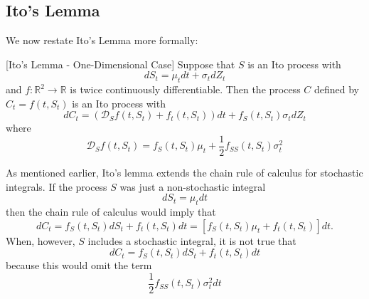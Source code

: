 \documentclass[\topdir/lecture\_notes.tex]{subfiles}
\begin{document}
\subsection{Ito's Lemma}
We now restate Ito's Lemma more formally:
\begin{theorem}\label{thm:ito_lemma}[Ito's Lemma - One-Dimensional Case]
Suppose that $S$ is an Ito process with
\begin{equation*}
dS_{t}=\mu_{t} d t+\sigma_{t} dZ_{t}
\end{equation*}
and $f: \mathbb{R}^{2} \rightarrow \mathbb{R}$ is twice continuously differentiable. Then the process $C$ defined by $C_{t}=f\left(t, S_{t}\right)$ is an Ito process with
\begin{equation*}
d C_{t}=\left(\mathcal{D}_{S} f\left(t, S_{t}\right)+f_{t}\left(t, S_{t}\right)\right) d t+f_{S}\left(t, S_{t}\right) \sigma_{t} d Z_{t}
\end{equation*}
where
\begin{equation*}
\mathcal{D}_{S} f\left(t, S_{t}\right)=f_{S}\left(t, S_{t}\right) \mu_{t}+\frac{1}{2} f_{S S}\left(t, S_{t}\right) \sigma_{t}^{2}
\end{equation*}
\end{theorem}
As mentioned earlier, Ito's lemma extends the chain rule of calculus for stochastic integrals. If the process $S$ was just a non-stochastic integral
\begin{equation*}
d S_{t}=\mu_{t} dt
\end{equation*}
then the chain rule of calculus would imply that
\begin{equation*}
d C_{t}=f_{S}(t, S_{t}) d S_{t}+f_{t}(t, S_{t}) d t=[f_{S}(t, S_{t}) \mu_{t}+f_{t}(t, S_{t})] dt.
\end{equation*}
When, however, $S$ includes a stochastic integral, it is not true that
\begin{equation*}
d C_{t}=f_{S}(t, S_{t}) d S_{t}+f_{t}(t, S_{t}) d t
\end{equation*}
because this would omit the term
\begin{equation*}
\frac{1}{2} f_{S S}\left(t, S_{t}\right) \sigma_{t}^{2} d t
\end{equation*}
\end{document}
